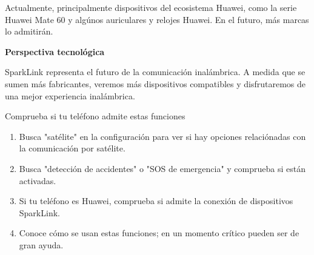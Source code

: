 Actualmente, principalmente dispositivos del ecosistema Huawei, como la serie Huawei Mate 60 y algúnos auriculares y relojes Huawei. En el futuro, más marcas lo admitirán.

\textbf{Perspectiva tecnológica}\par

SparkLink representa el futuro de la comunicación inalámbrica. A medida que se sumen más fabricantes, veremos más dispositivos compatibles y disfrutaremos de una mejor experiencia inalámbrica.

\begin{tcbpractice}{Comprueba si tu teléfono admite estas funciones}
\begin{enumerate}
  \item Busca "satélite" en la configuración para ver si hay opciones relaciónadas con la comunicación por satélite.
  \item Busca "detección de accidentes" o "SOS de emergencia" y comprueba si están activadas.
  \item Si tu teléfono es Huawei, comprueba si admite la conexión de dispositivos SparkLink.
  \item Conoce cómo se usan estas funciones; en un momento crítico pueden ser de gran ayuda.
\end{enumerate}

\end{tcbpractice}
